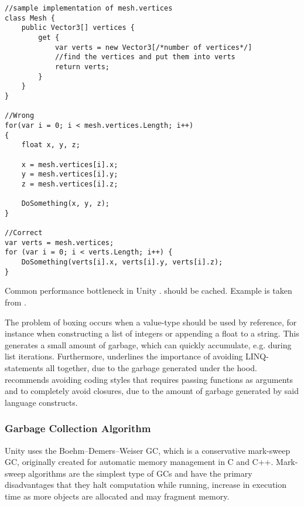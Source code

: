 \begin{listing}
\begin{verbatim}
//sample implementation of mesh.vertices
class Mesh {
    public Vector3[] vertices {
        get {
            var verts = new Vector3[/*number of vertices*/]
            //find the vertices and put them into verts
            return verts;
        }
    }
}

//Wrong
for(var i = 0; i < mesh.vertices.Length; i++)
{
    float x, y, z;

    x = mesh.vertices[i].x;
    y = mesh.vertices[i].y;
    z = mesh.vertices[i].z;

    DoSomething(x, y, z);
}

//Correct
var verts = mesh.vertices;
for (var i = 0; i < verts.Length; i++) {
    DoSomething(verts[i].x, verts[i].y, verts[i].z);
}
\end{verbatim}
\caption{Common performance bottleneck in Unity \cite{unity:heap}.  should be cached. Example is taken from \cite{unity:heap}.} \label{lst:unity:array:prop}
\end{listing}

The problem of boxing occurs when a value-type should be used by reference, for instance when constructing a list of integers or appending a float to a string. This generates a small amount of garbage, which can quickly accumulate, e.g. during list iterations. Furthermore, \cite{unity:optimisation} underlines the importance of avoiding \gls{LINQ}-statements all together, due to the garbage generated under the hood. \cite{unity:heap} recommends avoiding coding styles that requires passing functions as arguments and to completely avoid closures, due to the amount of garbage generated by said language constructs.

\subsubsection{Garbage Collection Algorithm}\label{sec:gc-strat}
Unity uses the Boehm–Demers–Weiser \gls{GC}, which is a conservative mark-sweep \gls{GC}\cite{unity:heap}, originally created for automatic memory management in C and C++\cite{boehm2007transparent}. Mark-sweep algorithms are the simplest type of \glspl{GC} and have the primary disadvantages that they halt computation while running, increase in execution time as more objects are allocated and may fragment memory\cite{sestoft2017programming}.

